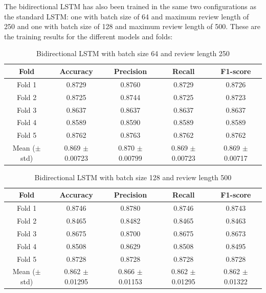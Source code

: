 \documentclass{article}
\begin{document}
The bidirectional LSTM has also been trained in the same two configurations as the standard LSTM: one with batch size of 64 and maximum review length of 250 and one with batch size of 128 and maximum review length of 500.
These are the training results for the different models and folds: 

\begin{table}[H]
  \centering
  \begin{tabular}{c|cccc}
      \toprule
      \textbf{Fold} & \textbf{Accuracy} & \textbf{Precision} & \textbf{Recall} & \textbf{F1-score} \\
      \midrule
      Fold 1 & 0.8729 & 0.8760 & 0.8729 & 0.8726 \\
      Fold 2 & 0.8725 & 0.8744 & 0.8725 & 0.8723 \\
      Fold 3 & 0.8637 & 0.8637 & 0.8637 & 0.8637 \\
      Fold 4 & 0.8589 & 0.8590 & 0.8589 & 0.8589 \\
      Fold 5 & 0.8762 & 0.8763 & 0.8762 & 0.8762 \\
      \midrule
      Mean ($\pm$ std) & 0.869 $\pm$ 0.00723 & 0.870 $\pm$ 0.00799 & 0.869 $\pm$ 0.00723 & 0.869 $\pm$ 0.00717 \\
      \bottomrule
  \end{tabular}
  \vspace{0.5em}
  \caption{Bidirectional LSTM with batch size 64 and review length 250}
\end{table}

\begin{table}[H]
  \centering
  \begin{tabular}{c|cccc}
      \toprule
      \textbf{Fold} & \textbf{Accuracy} & \textbf{Precision} & \textbf{Recall} & \textbf{F1-score} \\
      \midrule
      Fold 1 & 0.8746 & 0.8780 & 0.8746 & 0.8743 \\
      Fold 2 & 0.8465 & 0.8482 & 0.8465 & 0.8463 \\
      Fold 3 & 0.8675 & 0.8700 & 0.8675 & 0.8673 \\
      Fold 4 & 0.8508 & 0.8629 & 0.8508 & 0.8495 \\
      Fold 5 & 0.8728 & 0.8728 & 0.8728 & 0.8728 \\
      \midrule
      Mean ($\pm$ std) & 0.862 $\pm$ 0.01295 & 0.866 $\pm$ 0.01153 & 0.862 $\pm$ 0.01295 & 0.862 $\pm$ 0.01322 \\
      \bottomrule
  \end{tabular}
  \vspace{0.5em}
  \caption{Bidirectional LSTM with batch size 128 and review length 500}
\end{table}




\end{document}
